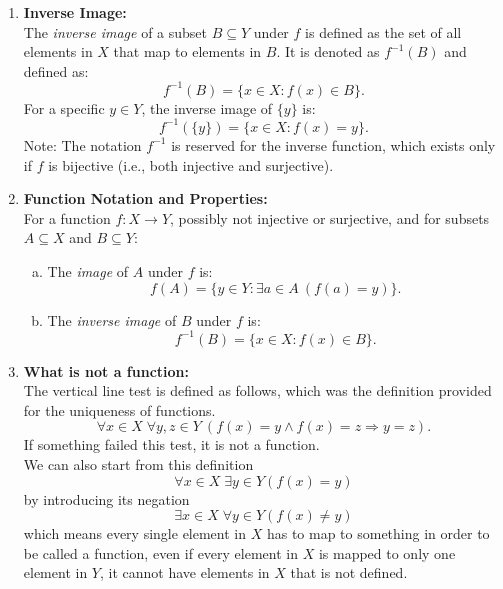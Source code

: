 \documentclass[12pt]{book}
\newcommand{\paren}[1]{\left( #1 \right)}
\begin{document}
\begin{enumerate}
    \item \textbf{Inverse Image:} \\
    The \textit{inverse image} of a subset $B \subseteq Y$ under $f$ is defined as the set of all elements in $X$ that map to elements in $B$. It is denoted as $f^{-1}(B)$ and defined as:
    \[
    f^{-1}(B) = \{ x \in X \colon f(x) \in B \}.
    \]
    For a specific $y \in Y$, the inverse image of $\{y\}$ is:
    \[
    f^{-1}(\{y\}) = \{ x \in X \colon f(x) = y \}.
    \]
    Note: The notation $f^{-1}$ is reserved for the inverse function, which exists only if $f$ is bijective (i.e., both injective and surjective).

    \item \textbf{Function Notation and Properties:} \\
    For a function $f \colon X \to Y$, possibly not injective or surjective, and for subsets $A \subseteq X$ and $B \subseteq Y$:
    \begin{enumerate}[a.]
        \item The \textit{image} of $A$ under $f$ is:
        \[
        f(A) = \{ y \in Y \colon \exists a \in A\ (f(a) = y) \}.
        \]
        \item The \textit{inverse image} of $B$ under $f$ is:
        \[
        f^{-1}(B) = \{ x \in X \colon f(x) \in B \}.
        \]
    \end{enumerate}

    \item \textbf{What is not a function:}\\ 
    The vertical line test is defined as follows, which was the definition provided for the uniqueness of functions.
    \[
    \forall x \in X \; \forall y,z \in Y\ (f(x)=y \wedge f(x)=z \Rightarrow y=z).
    \]
    If something failed this test, it is not a function.\\
    We can also start from this definition
    \[
    \forall x \in X \; \exists y \in Y \paren{ f(x) = y}
    \]
    by introducing its negation
    \[
    \exists x \in X \; \forall y \in Y \paren{f(x) \neq y}
    \]
    which means every single element in $X$ has to map to something in order to be called a function, even if every element in $X$ is mapped to only one element in $Y$, it cannot have elements in $X$ that is not defined. 
\end{enumerate}
\end{document}
